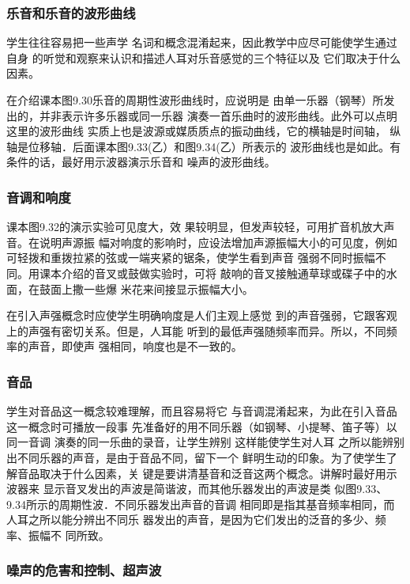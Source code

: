 \subsubsection{乐音和乐音的波形曲线}

学生往往容易把一些声学
名词和概念混淆起来，因此教学中应尽可能使学生通过自身
的听觉和观察来认识和描述人耳对乐音感觉的三个特征以及
它们取决于什么因素。

在介绍课本图9.30乐音的周期性波形曲线时，应说明是
由单一乐器（钢琴）所发出的，并非表示许多乐器或同一乐器
演奏一首乐曲时的波形曲线。此外可以点明这里的波形曲线
实质上也是波源或媒质质点的振动曲线，它的横轴是时间轴，
纵轴是位移轴．后面课本图9.33(乙）和图9.34(乙）所表示的
波形曲线也是如此。有条件的话，最好用示波器演示乐音和
噪声的波形曲线。

\subsubsection{音调和响度}

课本图9.32的演示实验可见度大，效
果较明显，但发声较轻，可用扩音机放大声音。在说明声源振
幅对响度的影响时，应设法增加声源振幅大小的可见度，例如
可轻拨和重拨拉紧的弦或一端夹紧的锯条，使学生看到声音
强弱不同时振幅不同。用课本介绍的音叉或鼓做实验时，可将
敲响的音叉接触通草球或碟子中的水面，在鼓面上撒一些爆
米花来间接显示振幅大小。

在引入声强概念时应使学生明确响度是人们主观上感觉
到的声音强弱，它跟客观上的声强有密切关系。但是，人耳能
听到的最低声强随频率而异。所以，不同频率的声音，即使声
强相同，响度也是不一致的。

\subsubsection{音品}

学生对音品这一概念较难理解，而且容易将它
与音调混淆起来，为此在引入音品这一概念时可播放一段事
先准备好的用不同乐器（如钢琴、小提琴、笛子等）以同一音调
演奏的同一乐曲的录音，让学生辨别 这样能使学生对人耳
之所以能辨别出不同乐器的声音，是由于音品不同，留下一个
鲜明生动的印象。为了使学生了解音品取决于什么因素，关
键是要讲清基音和泛音这两个概念。讲解时最好用示波器来
显示音叉发出的声波是简谐波，而其他乐器发出的声波是类
似图9.33、9.34所示的周期性波．不同乐器发出声音的音调
相同即是指其基音频率相同，而人耳之所以能分辨出不同乐
器发出的声音，是因为它们发出的泛音的多少、频率、振幅不
同所致。

\subsubsection{噪声的危害和控制、超声波}

